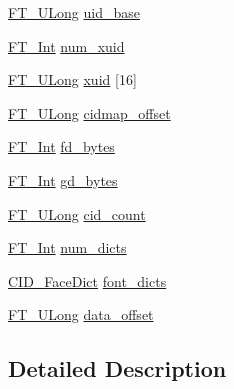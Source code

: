 \begin{DoxyCompactItemize}
\item 
\mbox{\hyperlink{fttypes_8h_a4fac88bdba78eb76b505efa6e4fbf3f5}{F\+T\+\_\+\+U\+Long}} \mbox{\hyperlink{struct_c_i_d___face_info_rec___a1fae2d9b863a9e27089894789ab4413e}{uid\+\_\+base}}
\item 
\mbox{\hyperlink{fttypes_8h_af90e5fb0d07e21be9fe6faa33f02484c}{F\+T\+\_\+\+Int}} \mbox{\hyperlink{struct_c_i_d___face_info_rec___ab7dc17fbfc7926996832513266e88623}{num\+\_\+xuid}}
\item 
\mbox{\hyperlink{fttypes_8h_a4fac88bdba78eb76b505efa6e4fbf3f5}{F\+T\+\_\+\+U\+Long}} \mbox{\hyperlink{struct_c_i_d___face_info_rec___a32cd8836dd8a395d9aa6fb5831f06b27}{xuid}} \mbox{[}16\mbox{]}
\item 
\mbox{\hyperlink{fttypes_8h_a4fac88bdba78eb76b505efa6e4fbf3f5}{F\+T\+\_\+\+U\+Long}} \mbox{\hyperlink{struct_c_i_d___face_info_rec___a8c72c1a90704c7e3519ca182613fec5a}{cidmap\+\_\+offset}}
\item 
\mbox{\hyperlink{fttypes_8h_af90e5fb0d07e21be9fe6faa33f02484c}{F\+T\+\_\+\+Int}} \mbox{\hyperlink{struct_c_i_d___face_info_rec___a72944c0b4e85dba619adaf114ff7a8b1}{fd\+\_\+bytes}}
\item 
\mbox{\hyperlink{fttypes_8h_af90e5fb0d07e21be9fe6faa33f02484c}{F\+T\+\_\+\+Int}} \mbox{\hyperlink{struct_c_i_d___face_info_rec___a4f1caffd756d0daebbc69af0dcdd74a0}{gd\+\_\+bytes}}
\item 
\mbox{\hyperlink{fttypes_8h_a4fac88bdba78eb76b505efa6e4fbf3f5}{F\+T\+\_\+\+U\+Long}} \mbox{\hyperlink{struct_c_i_d___face_info_rec___a5eae3fdfaded7bdef4e0bd027ecba595}{cid\+\_\+count}}
\item 
\mbox{\hyperlink{fttypes_8h_af90e5fb0d07e21be9fe6faa33f02484c}{F\+T\+\_\+\+Int}} \mbox{\hyperlink{struct_c_i_d___face_info_rec___a3b53b4e162a3c1434c6b91334aa69041}{num\+\_\+dicts}}
\item 
\mbox{\hyperlink{t1tables_8h_a34b9250866d5498cf916e98d87be861d}{C\+I\+D\+\_\+\+Face\+Dict}} \mbox{\hyperlink{struct_c_i_d___face_info_rec___a821a773b846c837338d1c03984e5e7d5}{font\+\_\+dicts}}
\item 
\mbox{\hyperlink{fttypes_8h_a4fac88bdba78eb76b505efa6e4fbf3f5}{F\+T\+\_\+\+U\+Long}} \mbox{\hyperlink{struct_c_i_d___face_info_rec___a31e8fb9ac2b0c1fa63220e5e07aeea97}{data\+\_\+offset}}
\end{DoxyCompactItemize}


\subsection{Detailed Description}



